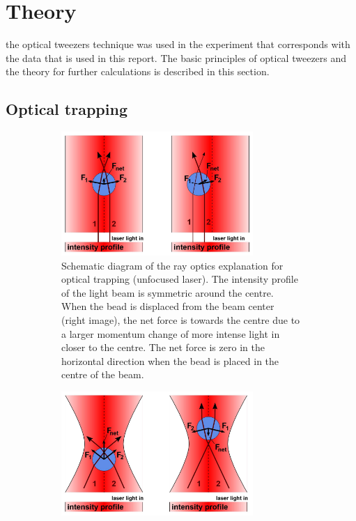 \section{Theory}

 the optical tweezers technique was used in the experiment that corresponds with the data that is used in this report. The basic principles of optical tweezers and the theory for further calculations is described in this section.\\

\subsection{Optical trapping}

\begin{figure}
    \centering
    \begin{subfigure}{0.35\textwidth}
    	\centering
    	\includegraphics[width=0.8\textwidth,keepaspectratio]{figures/Optical_trap_unfocused.jpg}
    	\caption{ Schematic diagram of the ray optics explanation for optical trapping (unfocused laser). The intensity profile of the light beam is symmetric around the centre. When the bead is displaced from the beam center (right image), the net force is towards the centre due to a larger momentum change of more intense light in closer to the centre. The net force is zero in the horizontal direction when the bead is placed in the centre of the beam. }
    	\label{fig_optic_trap_1}
	\end{subfigure}
	\begin{subfigure}{0.35\textwidth}
		\centering
    	\includegraphics[width=0.8\textwidth,keepaspectratio]{figures/Optical_trap_focused.jpg}

\end{subfigure}
\end{figure}

